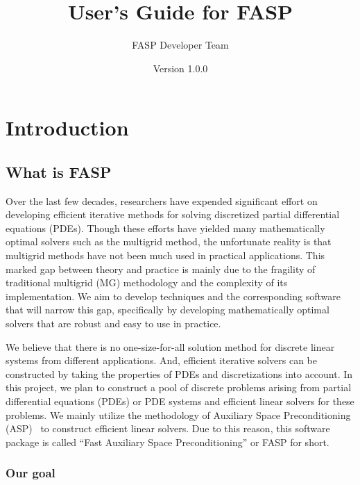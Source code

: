\documentclass[11pt]{memoir}
\title{User's Guide for FASP}
\author{FASP Developer Team}
\date{Version 1.0.0} %
\begin{document}
\maketitle

\newpage
\tableofcontents

\chapter{Introduction}\label{ch:intro}

\section{What is FASP}\label{sec:goal}

Over the last few decades, researchers have expended significant effort on developing efficient iterative methods for solving discretized partial differential equations (PDEs). Though these efforts have yielded many mathematically optimal solvers such as the multigrid method, the unfortunate reality is that multigrid methods have not been much used in practical applications. This marked gap between theory and practice is mainly due to the fragility of traditional multigrid (MG) methodology and the complexity of its implementation. We aim to develop techniques and the corresponding software that will narrow this gap, specifically by developing mathematically optimal solvers that are robust and easy to use in practice. 

We believe that there is no one-size-for-all solution method for discrete linear systems from different applications. And, efficient iterative solvers can be constructed by taking the properties of PDEs and discretizations into account. In this project, we plan to construct a pool of discrete problems arising from partial differential equations (PDEs) or PDE systems and efficient linear solvers for these problems. We mainly utilize the methodology of Auxiliary Space Preconditioning (ASP)~\cite{Xu.Xu.2010ff} to construct efficient linear solvers. Due to this reason, this software package is called ``Fast Auxiliary Space Preconditioning'' or FASP for short. 

\subsection{Our goal}
\end{document}
